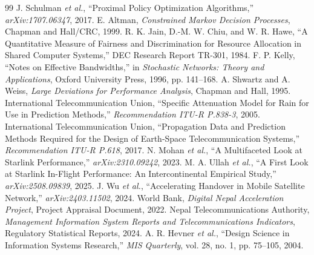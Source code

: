 \begin{thebibliography}{99}
 J. Schulman \textit{et al.}, ``Proximal Policy Optimization Algorithms,'' \textit{arXiv:1707.06347}, 2017.
 E. Altman, \textit{Constrained Markov Decision Processes}, Chapman and Hall/CRC, 1999.
 R. K. Jain, D.-M. W. Chiu, and W. R. Hawe, ``A Quantitative Measure of Fairness and Discrimination for Resource Allocation in Shared Computer Systems,'' DEC Research Report TR-301, 1984.
 F. P. Kelly, ``Notes on Effective Bandwidths,'' in \textit{Stochastic Networks: Theory and Applications}, Oxford University Press, 1996, pp. 141--168.
 A. Shwartz and A. Weiss, \textit{Large Deviations for Performance Analysis}, Chapman and Hall, 1995.
 International Telecommunication Union, ``Specific Attenuation Model for Rain for Use in Prediction Methods,'' \textit{Recommendation ITU-R P.838-3}, 2005.
 International Telecommunication Union, ``Propagation Data and Prediction Methods Required for the Design of Earth-Space Telecommunication Systems,'' \textit{Recommendation ITU-R P.618}, 2017.
 N. Mohan \textit{et al.}, ``A Multifaceted Look at Starlink Performance,'' \textit{arXiv:2310.09242}, 2023.
 M. A. Ullah \textit{et al.}, ``A First Look at Starlink In-Flight Performance: An Intercontinental Empirical Study,'' \textit{arXiv:2508.09839}, 2025.
 J. Wu \textit{et al.}, ``Accelerating Handover in Mobile Satellite Network,'' \textit{arXiv:2403.11502}, 2024.
 World Bank, \textit{Digital Nepal Acceleration Project}, Project Appraisal Document, 2022.
 Nepal Telecommunications Authority, \textit{Management Information System Reports and Telecommunications Indicators}, Regulatory Statistical Reports, 2024.
 A. R. Hevner \textit{et al.}, ``Design Science in Information Systems Research,'' \textit{MIS Quarterly}, vol. 28, no. 1, pp. 75--105, 2004.

\end{thebibliography}
